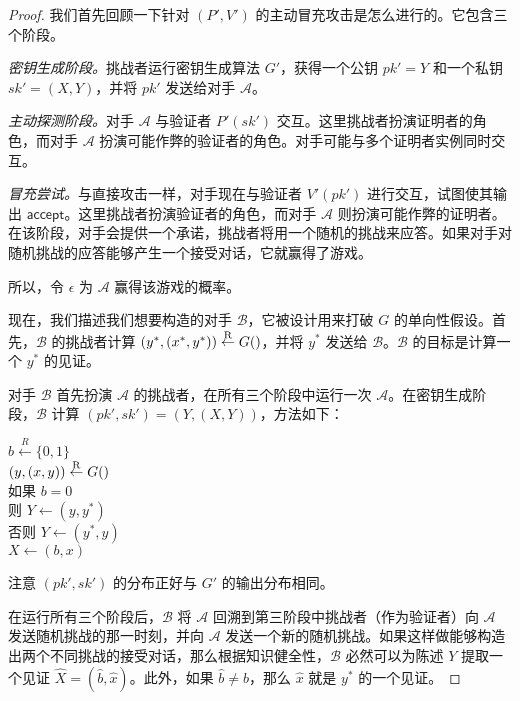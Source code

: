 \begin{proof}
我们首先回顾一下针对 $(P',V')$ 的主动冒充攻击是怎么进行的。它包含三个阶段。

\emph{密钥生成阶段。}挑战者运行密钥生成算法 $G'$，获得一个公钥 $pk'=Y$ 和一个私钥 $sk'=(X,Y)$，并将 $pk'$ 发送给对手 $\mathcal{A}$。

\emph{主动探测阶段。}对手 $\mathcal{A}$ 与验证者 $P'(sk')$ 交互。这里挑战者扮演证明者的角色，而对手 $\mathcal{A}$ 扮演可能作弊的验证者的角色。对手可能与多个证明者实例同时交互。

\emph{冒充尝试。}与直接攻击一样，对手现在与验证者 $V'(pk')$ 进行交互，试图使其输出 $\mathsf{accept}$。这里挑战者扮演验证者的角色，而对手 $\mathcal{A}$ 则扮演可能作弊的证明者。在该阶段，对手会提供一个承诺，挑战者将用一个随机的挑战来应答。如果对手对随机挑战的应答能够产生一个接受对话，它就赢得了游戏。

所以，令 $\epsilon$ 为 $\mathcal{A}$ 赢得该游戏的概率。

现在，我们描述我们想要构造的对手 $\mathcal{B}$，它被设计用来打破 $G$ 的单向性假设。首先，$\mathcal{B}$ 的挑战者计算 $(y^*,(x^*,y^*))\overset{\rm R}\leftarrow G()$，并将 $y^*$ 发送给 $\mathcal{B}$。$\mathcal{B}$ 的目标是计算一个 $y^*$ 的见证。

对手 $\mathcal{B}$ 首先扮演 $\mathcal{A}$ 的挑战者，在所有三个阶段中运行一次 $\mathcal{A}$。在密钥生成阶段，$\mathcal{B}$ 计算 $(pk',sk')=(Y,(X,Y))$，方法如下：

\vspace{8pt}

\hspace*{40pt} $b\overset{R}\leftarrow\{0,1\}$\\
\hspace*{62pt} $(y,(x,y))\overset{\rm R}\leftarrow G()$\\
\hspace*{62pt} 如果 $b=0$\\
\hspace*{82pt} 则 $Y\leftarrow(y,y^*)$\\
\hspace*{82pt} 否则 $Y\leftarrow(y^*,y)$\\
\hspace*{62pt} $X\leftarrow(b,x)$

\vspace{8pt}

\noindent
注意 $(pk',sk')$ 的分布正好与 $G'$ 的输出分布相同。

在运行所有三个阶段后，$\mathcal{B}$ 将 $\mathcal{A}$ 回溯到第三阶段中挑战者（作为验证者）向 $\mathcal{A}$ 发送随机挑战的那一时刻，并向 $\mathcal{A}$ 发送一个新的随机挑战。如果这样做能够构造出两个不同挑战的接受对话，那么根据知识健全性，$\mathcal{B}$ 必然可以为陈述 $Y$ 提取一个见证 $\widehat X=(\hat b,\hat x)$。此外，如果 $\hat b\neq b$，那么 $\hat x$ 就是 $y^*$ 的一个见证。


\end{proof}
